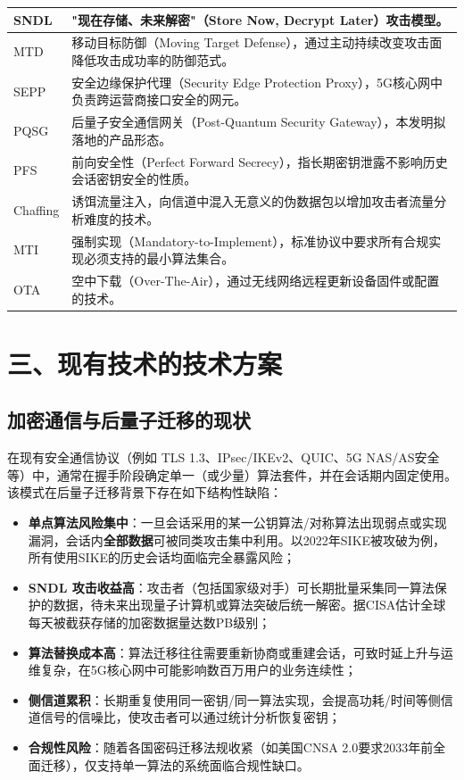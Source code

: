 ﻿\documentclass[12pt,a4paper]{article}
\begin{document}
\begin{longtable}{|>{\raggedright\arraybackslash}p{2.8cm}|>{\raggedright\arraybackslash}p{11.2cm}|}
\hline
SNDL & "现在存储、未来解密"（Store Now, Decrypt Later）攻击模型。\\
\hline
MTD & 移动目标防御（Moving Target Defense），通过主动持续改变攻击面降低攻击成功率的防御范式。\\
\hline
SEPP & 安全边缘保护代理（Security Edge Protection Proxy），5G核心网中负责跨运营商接口安全的网元。\\
\hline
PQSG & 后量子安全通信网关（Post-Quantum Security Gateway），本发明拟落地的产品形态。\\
\hline
PFS & 前向安全性（Perfect Forward Secrecy），指长期密钥泄露不影响历史会话密钥安全的性质。\\
\hline
Chaffing & 诱饵流量注入，向信道中混入无意义的伪数据包以增加攻击者流量分析难度的技术。\\
\hline
MTI & 强制实现（Mandatory-to-Implement），标准协议中要求所有合规实现必须支持的最小算法集合。\\
\hline
OTA & 空中下载（Over-The-Air），通过无线网络远程更新设备固件或配置的技术。\\
\hline
\end{longtable}

\section*{三、现有技术的技术方案}

\subsection*{加密通信与后量子迁移的现状}

在现有安全通信协议（例如 TLS 1.3、IPsec/IKEv2、QUIC、5G NAS/AS安全等）中，通常在握手阶段确定单一（或少量）算法套件，并在会话期内固定使用。该模式在后量子迁移背景下存在如下结构性缺陷：

\begin{itemize}
    \item \textbf{单点算法风险集中}：一旦会话采用的某一公钥算法/对称算法出现弱点或实现漏洞，会话内\textbf{全部数据}可被同类攻击集中利用。以2022年SIKE被攻破为例，所有使用SIKE的历史会话均面临完全暴露风险；
    \item \textbf{SNDL 攻击收益高}：攻击者（包括国家级对手）可长期批量采集同一算法保护的数据，待未来出现量子计算机或算法突破后统一解密。据CISA估计全球每天被截获存储的加密数据量达数PB级别；
    \item \textbf{算法替换成本高}：算法迁移往往需要重新协商或重建会话，可致时延上升与运维复杂，在5G核心网中可能影响数百万用户的业务连续性；
    \item \textbf{侧信道累积}：长期重复使用同一密钥/同一算法实现，会提高功耗/时间等侧信道信号的信噪比，使攻击者可以通过统计分析恢复密钥；
    \item \textbf{合规性风险}：随着各国密码迁移法规收紧（如美国CNSA 2.0要求2033年前全面迁移），仅支持单一算法的系统面临合规性缺口。
\end{itemize}
\end{document}
